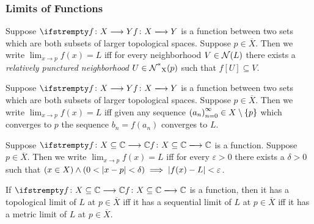 \subsubsection{Limits of Functions}
\begin{definition}
Suppose $\fn{f}{X}{Y}$ is a function between two sets which are both subsets of larger topological spaces. Suppose $p \in \overline{X}$. Then we write $\lim_{x \to p} f(x) = L$ iff for every neighborhood $V \in \nbhd{L}$ there exists a \emph{relatively punctured neighborhood} $U \in \rpnbhd{p}{X}$ such that $f[U] \subseteq V$.
\end{definition}
\begin{definition}
Suppose $\fn{f}{X}{Y}$ is a function between two sets which are both subsets of larger topological spaces. Suppose $p \in \overline{X}$. Then we write $\lim_{x \to p} f(x) = L$ iff given any sequence $\seq{a} \in X\setminus \{p\}$ which converges to $p$ the sequence $b_n = f(a_n)$ converges to $L$.
\end{definition}
\begin{definition}
Suppose $\fn{f}{X\subseteq\mathbb{C}}{\mathbb{C}}$ is a function. Suppose $p \in \overline{X}$. Then we write $\lim_{x \to p} f(x) = L$ iff for every $\varepsilon > 0$ there exists a $\delta > 0$ such that $(x \in X) \land (0<\modulus{x-p}< \delta) \implies \modulus{f(x)-L} < \varepsilon$.
\end{definition}
\begin{theorem}
If $\fn{f}{X\subseteq\mathbb{C}}{\mathbb{C}}$ is a function, then it has a topological limit of $L$ at $p \in \overline{X}$ iff it has a sequential limit of $L$ at $p \in \overline{X}$ iff it has a metric limit of $L$ at $p \in \overline{X}$.
\end{theorem}
